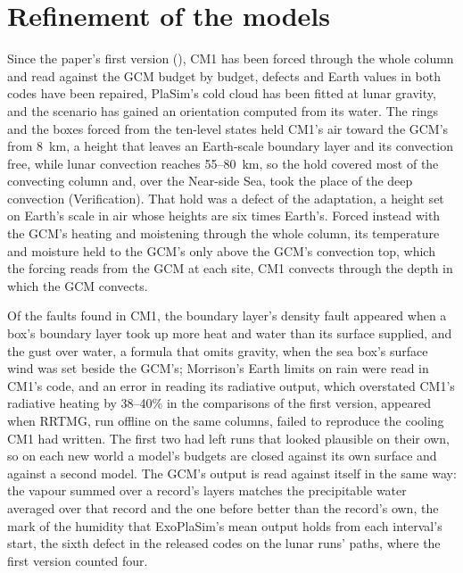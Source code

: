 \section{Refinement of the models}

Since the paper's first version (), CM1 has been forced through the whole column and read against the
GCM budget by budget, defects and Earth values in both codes have been repaired, PlaSim's cold cloud has been fitted
at lunar gravity, and the scenario has gained an orientation computed from its water. The rings and the boxes forced
from the ten-level states held CM1's air toward the GCM's from 8~km, a height that leaves an Earth-scale boundary
layer and its convection free, while lunar convection reaches 55--80~km, so the hold covered most of the convecting
column and, over the Near-side Sea, took the place of the deep convection (Verification). That hold was a
defect of the adaptation, a height set on Earth's scale in air whose heights are six times Earth's. Forced instead
with the GCM's heating and moistening through the whole column, its temperature and moisture held to the GCM's only
above the GCM's convection top, which the forcing reads from the GCM at each site, CM1 convects through the depth in
which the GCM convects.

Of the faults found in CM1, the boundary layer's density fault appeared when a box's boundary layer took up more heat
and water than its surface supplied, and the gust over water, a formula that omits gravity, when the sea box's
surface wind was set beside the GCM's; Morrison's Earth limits on rain were read in CM1's code, and an error in
reading its radiative output, which overstated CM1's radiative heating by 38--40\% in the comparisons of the first
version, appeared when RRTMG, run offline on the same columns, failed to reproduce the cooling CM1 had
written. The first two had left runs that looked plausible on their own,
so on each new world a model's budgets are closed against its own surface and against a second model. The GCM's
output is read against itself in the same way: the vapour summed over a record's layers matches the precipitable
water averaged over that record and the one before better than the record's own, the mark of the humidity that
ExoPlaSim's mean output holds from each interval's start, the sixth defect in the released codes on the lunar runs'
paths, where the first version counted four.

